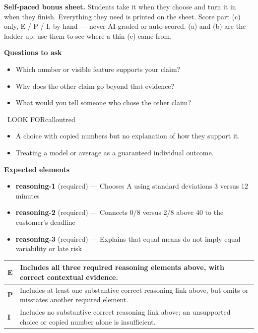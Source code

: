 \documentclass[11pt]{article}
\begin{document}
\textbf{Self-paced bonus sheet.} Students take it when they choose and turn it in when they finish. Everything they need is printed on the sheet. Score part (c) only, E / P / I, by hand --- never AI-graded or auto-scored. (a) and (b) are the ladder up; use them to see where a thin (c) came from.\par

\textbf{Questions to ask}
\begin{itemize}[leftmargin=1.5em,itemsep=2pt,topsep=2pt]
  \item Which number or visible feature supports your claim?
  \item Why does the other claim go beyond that evidence?
  \item What would you tell someone who chose the other claim?
\end{itemize}

\begin{callout}{\IconWarn\ LOOK FOR}{calloutred}
\begin{itemize}[leftmargin=1.5em,itemsep=2pt,topsep=2pt]
  \item A choice with copied numbers but no explanation of how they support it.
  \item Treating a model or average as a guaranteed individual outcome.
\end{itemize}
\end{callout}


\textbf{Expected elements}
\begin{itemize}[leftmargin=1.5em,itemsep=2pt,topsep=2pt]
  \item \textbf{reasoning-1} (required) --- Chooses A using standard deviations 3 versus 12 minutes
  \item \textbf{reasoning-2} (required) --- Connects 0/8 versus 2/8 above 40 to the customer's deadline
  \item \textbf{reasoning-3} (required) --- Explains that equal means do not imply equal variability or late risk
\end{itemize}

{\small\renewcommand{\arraystretch}{1.25}
\noindent\begin{tabular}{|p{0.5in}|p{5.9in}|}
\hline
\textbf{E} & Includes all three required reasoning elements above, with correct contextual evidence. \\ \hline
\textbf{P} & Includes at least one substantive correct reasoning link above, but omits or misstates another required element. \\ \hline
\textbf{I} & Includes no substantive correct reasoning link above; an unsupported choice or copied number alone is insufficient. \\ \hline
\end{tabular}}
\end{document}

